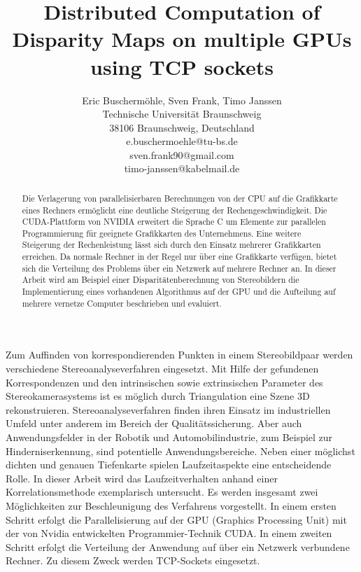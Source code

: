 \documentclass[times, 10pt,twocolumn]{article}
\begin{document}
\title{Distributed Computation of Disparity Maps on multiple GPUs using TCP sockets}

\author{Eric Buschermöhle, Sven Frank, Timo Janssen\\
Technische Universität Braunschweig \\  38106 Braunschweig, Deutschland\\
e.buschermoehle@tu-bs.de\\
sven.frank90@gmail.com\\
timo-janssen@kabelmail.de\\
}


\maketitle
\thispagestyle{empty}

\begin{abstract}
Die Verlagerung von parallelisierbaren Berechnungen von der CPU auf die Grafikkarte eines Rechners ermöglicht eine deutliche Steigerung der Rechengeschwindigkeit. Die CUDA-Plattform von NVIDIA erweitert die Sprache C um Elemente zur parallelen Programmierung für geeignete Grafikkarten des Unternehmens. Eine weitere Steigerung der Rechenleistung lässt sich durch den Einsatz mehrerer Grafikkarten erreichen. Da normale Rechner in der Regel nur über eine Grafikkarte verfügen, bietet sich die Verteilung des Problems über ein Netzwerk auf mehrere Rechner an. In dieser Arbeit wird am Beispiel einer Disparitätenberechnung von Stereobildern die Implementierung eines vorhandenen Algorithmus auf der GPU und die Aufteilung auf mehrere vernetze Computer beschrieben und evaluiert.
 
\end{abstract}




Zum Auffinden von korrespondierenden Punkten in einem Stereobildpaar werden verschiedene Stereoanalyseverfahren eingesetzt. Mit Hilfe der gefundenen Korrespondenzen und den intrinsischen sowie extrinsischen Parameter des Stereokamerasystems ist es möglich durch Triangulation eine Szene 3D rekonstruieren. Stereoanalyseverfahren finden ihren Einsatz im industriellen Umfeld unter anderem im Bereich der Qualitätssicherung. Aber auch Anwendungsfelder in der Robotik und Automobilindustrie, zum Beispiel zur Hinderniserkennung, sind potentielle Anwendungsbereiche. Neben einer möglichst dichten und genauen Tiefenkarte spielen Laufzeitaspekte eine entscheidende Rolle. In dieser Arbeit wird das Laufzeitverhalten anhand einer Korrelationsmethode exemplarisch untersucht. Es werden insgesamt zwei Möglichkeiten zur Beschleunigung des Verfahrens vorgestellt. In einem ersten Schritt erfolgt die Parallelisierung auf der GPU (Graphics Processing Unit) mit der von Nvidia entwickelten Programmier-Technik CUDA. In einem zweiten Schritt erfolgt die Verteilung der Anwendung auf über ein Netzwerk verbundene Rechner. Zu diesem Zweck werden TCP-Sockets eingesetzt.
\end{document}
